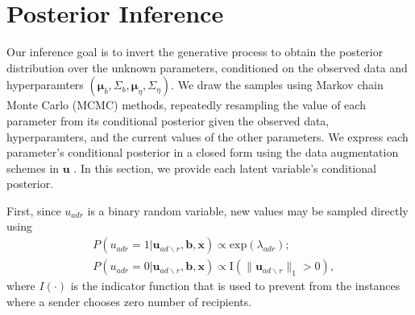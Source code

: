 \documentclass[12pt]{article}
\begin{document}
\section{Posterior Inference}\label{sec:inference}
Our inference goal is to invert the generative process to obtain the posterior distribution over the unknown parameters, conditioned on the observed data and hyperparamters $(\boldsymbol{\mu}_b, \Sigma_b, \boldsymbol{\mu}_\eta, \Sigma_\eta)$. We draw the samples using Markov chain Monte Carlo (MCMC) methods, repeatedly resampling the value of each parameter from its conditional posterior given the observed data, hyperparamters, and the current values of the other parameters. We express each parameter’s conditional posterior in a closed form using the data augmentation schemes in $\boldsymbol{u}$ \citep{tanner1987calculation}. In this section, we provide each latent variable's conditional posterior. 

First, since $u_{adr}$ is a binary random variable, new values may be sampled directly using
\begin{equation}
\begin{aligned}
&P(u_{adr}=1| \boldsymbol{u}_{ad\backslash r}, \boldsymbol{b}, \boldsymbol{x})
\propto \mbox{exp}(\lambda_{adr});\\
&P(u_{adr}=0| \boldsymbol{u}_{ad\backslash r},\boldsymbol{b}, \boldsymbol{x})\propto \text{I}(\lVert\boldsymbol{u}_{ad\backslash r}\rVert_1 > 0 ),
\end{aligned}
\label{eqn:latentreceiver}
\end{equation}
where $I(\cdot)$ is the indicator function that is used to prevent from the instances where a sender chooses zero number of recipients.
\end{document}

